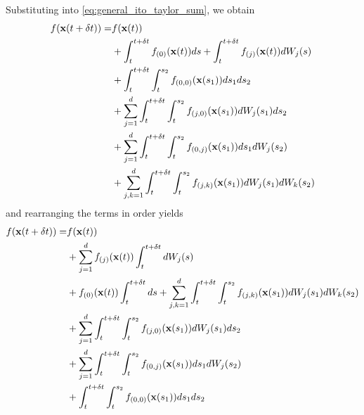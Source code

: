%
Substituting into \eqref{eq:general_ito_taylor_sum}, we obtain
%
\begin{equation} 
\begin{aligned}
f(\mathbf{x}(t+\delta t)) =&
f(\mathbf{x}(t)) \\
&+ \int_t^{t + \delta t} f_{(0)}(\mathbf{x}(t)) ds
+ \int_t^{t + \delta t} f_{(j)}(\mathbf{x}(t)) dW_j(s) \\
&+ \int_t^{t+\delta t} \int_t^{s_2} f_{(0,0)}(\mathbf{x}(s_1)) ds_1 ds_2 \\
&+ \sum_{j=1}^d \int_t^{t+\delta t} \int_t^{s_2} f_{(j,0)}(\mathbf{x}(s_1)) dW_j(s_1) ds_2 \\
&+ \sum_{j=1}^d \int_t^{t+\delta t} \int_t^{s_2} f_{(0,j)}(\mathbf{x}(s_1)) ds_1 dW_j(s_2) \\
&+ \sum_{j, k=1}^d \int_t^{t+\delta t} \int_t^{s_2} f_{(j,k)}(\mathbf{x}(s_1)) dW_j(s_1) dW_k(s_2) 
\end{aligned}
\end{equation}
%
and rearranging the terms in order yields
%
\begin{equation} \label{eq:integro_f}
\begin{aligned}
f(\mathbf{x}(t+\delta t)) =&
f(\mathbf{x}(t)) \\
&+ \sum_{j=1}^d f_{(j)}(\mathbf{x}(t)) \int_t^{t + \delta t} dW_j(s) \\
&+  f_{(0)}(\mathbf{x}(t)) \int_t^{t + \delta t} ds
+ \sum_{j, k=1}^d \int_t^{t+\delta t} \int_t^{s_2} f_{(j,k)}(\mathbf{x}(s_1)) dW_j(s_1) dW_k(s_2) \\
&+ \sum_{j=1}^d \int_t^{t+\delta t} \int_t^{s_2} f_{(j,0)}(\mathbf{x}(s_1)) dW_j(s_1) ds_2 \\
&+ \sum_{j=1}^d \int_t^{t+\delta t} \int_t^{s_2} f_{(0,j)}(\mathbf{x}(s_1)) ds_1 dW_j(s_2) \\
&+ \int_t^{t+\delta t} \int_t^{s_2} f_{(0,0)}(\mathbf{x}(s_1)) ds_1 ds_2 
\end{aligned}
\end{equation}

